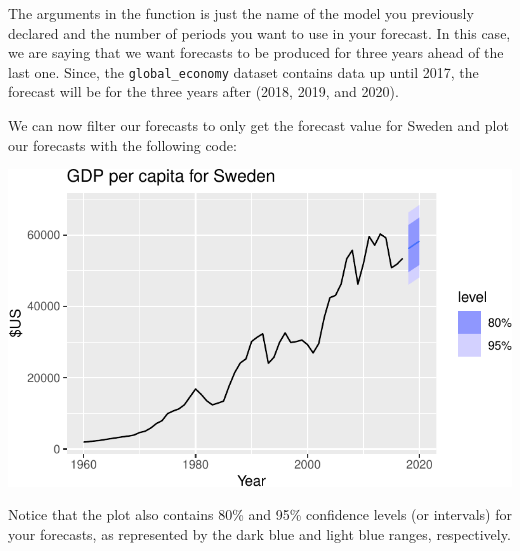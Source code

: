 \documentclass[
  letterpaper,
  DIV=11,
  numbers=noendperiod]{scrartcl}
\newenvironment{Shaded}{\begin{snugshade}}{\end{snugshade}}
\newcommand{\AttributeTok}[1]{\textcolor[rgb]{0.40,0.45,0.13}{#1}}
\newcommand{\CommentTok}[1]{\textcolor[rgb]{0.37,0.37,0.37}{#1}}
\newcommand{\FunctionTok}[1]{\textcolor[rgb]{0.28,0.35,0.67}{#1}}
\newcommand{\NormalTok}[1]{\textcolor[rgb]{0.00,0.23,0.31}{#1}}
\newcommand{\OtherTok}[1]{\textcolor[rgb]{0.00,0.23,0.31}{#1}}
\newcommand{\SpecialCharTok}[1]{\textcolor[rgb]{0.37,0.37,0.37}{#1}}
\newcommand{\StringTok}[1]{\textcolor[rgb]{0.13,0.47,0.30}{#1}}
\begin{document}
The arguments in the function is just the name of the model you
previously declared and the number of periods you want to use in your
forecast. In this case, we are saying that we want forecasts to be
produced for three years ahead of the last one. Since, the
\texttt{global\_economy} dataset contains data up until 2017, the
forecast will be for the three years after (2018, 2019, and 2020).

We can now filter our forecasts to only get the forecast value for
Sweden and plot our forecasts with the following code:

\begin{Shaded}
\end{Shaded}

\begin{center}
\includegraphics{chapter5_review_files/figure-pdf/unnamed-chunk-7-1.pdf}
\end{center}

Notice that the plot also contains 80\% and 95\% confidence levels (or
intervals) for your forecasts, as represented by the dark blue and light
blue ranges, respectively.
\end{document}
